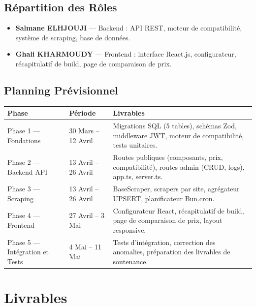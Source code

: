 \documentclass[12pt,a4paper]{article}
\begin{document}
\subsection{Répartition des Rôles}

\begin{itemize}[label=\textbullet]
  \item \textbf{Salmane ELHJOUJI} — Backend : API REST, moteur de compatibilité, système de scraping, base de données.
  \item \textbf{Ghali KHARMOUDY} — Frontend : interface React.js, configurateur, récapitulatif de build, page de comparaison de prix.
\end{itemize}

\subsection{Planning Prévisionnel}

\begin{longtable}{p{4.5cm} p{3cm} p{6cm}}
\toprule
\textbf{Phase} & \textbf{Période} & \textbf{Livrables} \\
\midrule
\endhead
Phase 1 — Fondations &
30 Mars -- 12 Avril &
Migrations SQL (5 tables), schémas Zod, middleware JWT, moteur de compatibilité, tests unitaires. \\
\midrule
Phase 2 — Backend API &
13 Avril -- 26 Avril &
Routes publiques (composants, prix, compatibilité), routes admin (CRUD, logs), app.ts, server.ts. \\
\midrule
Phase 3 — Scraping &
13 Avril -- 26 Avril &
BaseScraper, scrapers par site, agrégateur UPSERT, planificateur Bun.cron. \\
\midrule
Phase 4 — Frontend &
27 Avril -- 3 Mai &
Configurateur React, récapitulatif de build, page de comparaison de prix, layout responsive. \\
\midrule
Phase 5 — Intégration et Tests &
4 Mai -- 11 Mai &
Tests d'intégration, correction des anomalies, préparation des livrables de soutenance. \\
\bottomrule
\end{longtable}

\section{Livrables}
\end{document}
